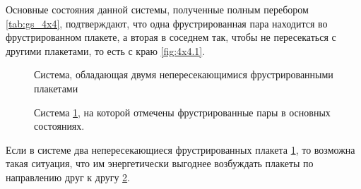 \documentclass[utf8, babel, sor, jor, amsmath, amssymb, reprint]{elsarticle} %
\begin{document}
Основные состояния данной системы, полученные полным перебором \ref{tab:gs_4x4}, подтверждают, что одна фрустрированная пара находится во фрустрированном плакете, а вторая в соседнем так, чтобы не пересекаться с другими плакетами, то есть с краю \ref{fig:4x4.1}.

\begin{figure}[H]
	\centering
	\caption{Система, обладающая двумя непересекающимися фрустрированными плакетами}
	\label{fig:4x7}
\end{figure}
\begin{figure}[H]
	\centering
	\caption{Система \ref{fig:4x7}, на которой отмечены фрустрированные пары  в основных состояниях.}
	\label{fig:4x7F}
\end{figure}

Если в системе два непересекающиеся фрустрированных плакета \ref{fig:4x7}, то возможна такая ситуация, что им энергетически выгоднее возбуждать плакеты по направлению друг к другу \ref{fig:4x7F}.
\end{document}
